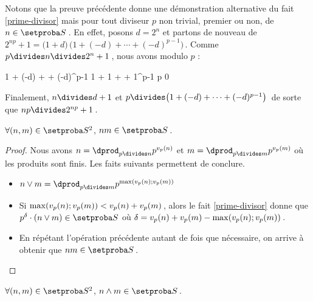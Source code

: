 Notons que la preuve précédente donne une démonstration alternative du fait \ref{prime-divisor} mais pour tout diviseur $p$ non trivial, premier ou non, de $n \in \ourset$\,.
En effet,
posons $d = 2^n$ et partons de nouveau de $2^{np} + 1 = \big( 1 + d \big) \, \big( 1 + (-d) + \cdots + (-d)^{p-1}  \big)$\,.
Comme $p \divides n \divides 2^n + 1$\,, nous avons modulo $p$ :

\medskip

\begin{stepcalc}[style = ar*, ope = \equiv]
	1 + (-d) + \cdots + (-d)^{p-1} 
	1 + 1 + \cdots + 1^{p-1} 
\explnext{}
	p
\explnext{}
	0
\end{stepcalc}

\medskip 

Finalement,
$n \divides d + 1$ et $p \divides \big( 1 + (-d) + \cdots + (-d)^{p-1}  \big)$\, de sorte que $n p \divides 2^{n p} + 1$\,.




\begin{fact} \label{product}
	$\forall (n , m) \in \ourset^2$, $n m \in \ourset$\,.
\end{fact}

\begin{proof}
	Nous avons
	$n = \dprod_{p \divides n} p^{\padicval{n}}$
	et
	$m = \dprod_{p \divides m} p^{\padicval{m}}$
	où les produits sont finis.
	Les faits suivants permettent de conclure.
%
	\begin{itemize}
		\item $n \vee m = \dprod_{p \divides m} p^{\max ( \padicval{n} ; \padicval{m} )}$

		\item Si $\max ( \padicval{n} ; \padicval{m} ) < \padicval{n} + \padicval{m}$\,, alors le fait \ref{prime-divisor} donne que $p^\delta \cdot ( n \vee m ) \in \ourset$ où $\delta = \padicval{n} + \padicval{m} - \max ( \padicval{n} ; \padicval{m} )$\,.

		\item En répétant l'opération précédente autant de fois que nécessaire, on arrive à obtenir que $n m \in \ourset$\,.
	\end{itemize}
\end{proof}




\begin{fact} \label{gcd}
	$\forall (n , m) \in \ourset^2$, $n \wedge m \in \ourset$\,.
\end{fact}

